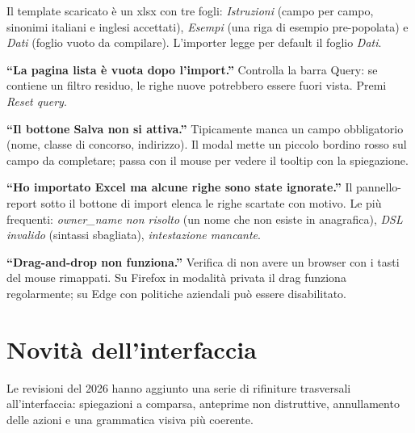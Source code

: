 Il template scaricato \`e un xlsx con tre fogli: \emph{Istruzioni}
(campo per campo, sinonimi italiani e inglesi accettati),
\emph{Esempi} (una riga di esempio pre-popolata) e \emph{Dati}
(foglio vuoto da compilare). L'importer legge per default il
foglio \emph{Dati}.

\fleuron

\begin{erroricomunibox}
\textbf{``La pagina lista \`e vuota dopo l'import.''} Controlla
la barra Query: se contiene un filtro residuo, le righe
nuove potrebbero essere fuori vista. Premi \emph{Reset query}.

\textbf{``Il bottone Salva non si attiva.''} Tipicamente
manca un campo obbligatorio (nome, classe di concorso,
indirizzo). Il modal mette un piccolo bordino rosso sul
campo da completare; passa con il mouse per vedere il tooltip
con la spiegazione.

\textbf{``Ho importato Excel ma alcune righe sono state
ignorate.''} Il pannello-report sotto il bottone di import
elenca le righe scartate con motivo. Le pi\`u frequenti:
\emph{owner\_name non risolto} (un nome che non esiste in
anagrafica), \emph{DSL invalido} (sintassi sbagliata),
\emph{intestazione mancante}.

\textbf{``Drag-and-drop non funziona.''} Verifica di non
avere un browser con i tasti del mouse rimappati. Su Firefox
in modalit\`a privata il drag funziona regolarmente; su Edge
con politiche aziendali pu\`o essere disabilitato.
\end{erroricomunibox}

\section{Novit\`a dell'interfaccia}
\label{sec:ui-novita}

\begin{novitabox}
Le revisioni del 2026 hanno aggiunto una serie di rifiniture trasversali
all'interfaccia: spiegazioni a comparsa, anteprime non distruttive,
annullamento delle azioni e una grammatica visiva pi\`u coerente.
\end{novitabox}

